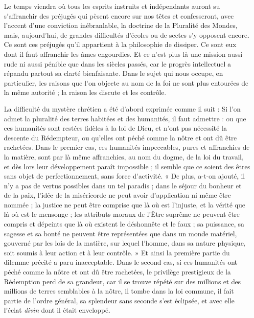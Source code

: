 \documentclass[a4paper, 11pt, oneside]{article}
\begin{document}
Le temps viendra où tous les esprits instruits et indépendants auront su s'affranchir des préjugés qui pèsent encore sur nos têtes et confesseront, avec l'accent d'une conviction inébranlable, la doctrine de la Pluralité des Mondes, mais, aujourd'hui, de grandes difficultés d'écoles ou de sectes s'y opposent encore. Ce sont ces préjugés qu'il appartient à la philosophie de dissiper. Ce sont eux dont il faut affranchir les âmes engourdies. Et ce n'est plus là une mission aussi rude ni aussi pénible que dans les siècles passés, car le progrès intellectuel a répandu partout sa clarté bienfaisante. Dans le sujet qui nous occupe, en particulier, les raisons que l'on objecte au nom de la foi ne sont plus entourées de la même autorité ; la raison les discute et les contrôle.

La difficulté du mystère chrétien a été d'abord exprimée comme il suit : Si l'on admet la pluralité des terres habitées et des humanités, il faut admettre : ou que ces humanités sont restées fidèles à la loi de Dieu, et n'ont pas nécessité la descente du Rédempteur, ou qu'elles ont péché comme la nôtre et ont dû être rachetées. Dans le premier cas, ces humanités impeccables, pures et affranchies de la matière, sont par là même affranchies, au nom du dogme, de la loi du travail, et dès lors leur développement paraît impossible ; il semble que ce soient des êtres sans objet de perfectionnement, sans force d'activité. « De plus, a-t-on ajouté, il n'y a pas de vertus possibles dans un tel paradis ; dans le séjour du bonheur et de la paix, l'idée de la miséricorde ne peut avoir d'application ni même être nommée ; la justice ne peut être comprise que là où est l'injuste, et la vérité que là où est le mensonge ; les attributs moraux de l'Être suprême ne peuvent être compris et dépeints que là où existent le déshonnête et le faux ; sa puissance, sa sagesse et sa bonté ne peuvent être représentées que dans un monde matériel, gouverné par les lois de la matière, sur lequel l'homme, dans sa nature physique, soit soumis à leur action et à leur contrôle. » Et ainsi la première partie du dilemme précité a paru inacceptable. Dans le second cas, si ces humanités ont péché comme la nôtre et ont dû être rachetées, le privilège prestigieux de la Rédemption perd de sa grandeur, car il se trouve répété sur des millions et des millions de terres semblables à la nôtre, il tombe dans la loi commune, il fait partie de l'ordre général, sa splendeur sans seconde s'est éclipsée, et avec elle l'éclat \emph{divin} dont il était enveloppé.
\end{document}
